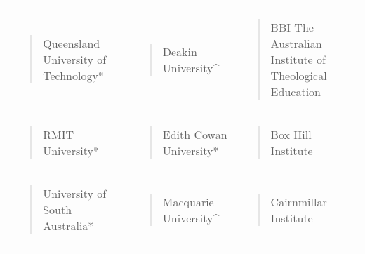 \documentclass[]{book}
\begin{document}
\begin{longtable}[]{@{}lll@{}}
\begin{minipage}[t]{0.32\columnwidth}\raggedright
\begin{quote}
Queensland University of Technology*
\end{quote}\strut
\end{minipage} & \begin{minipage}[t]{0.32\columnwidth}\raggedright
\begin{quote}
Deakin University\^{}
\end{quote}\strut
\end{minipage} & \begin{minipage}[t]{0.32\columnwidth}\raggedright
\begin{quote}
BBI The Australian Institute of Theological Education
\end{quote}\strut
\end{minipage}\tabularnewline
\begin{minipage}[t]{0.32\columnwidth}\raggedright
\begin{quote}
RMIT University*
\end{quote}\strut
\end{minipage} & \begin{minipage}[t]{0.32\columnwidth}\raggedright
\begin{quote}
Edith Cowan University*
\end{quote}\strut
\end{minipage} & \begin{minipage}[t]{0.32\columnwidth}\raggedright
\begin{quote}
Box Hill Institute
\end{quote}\strut
\end{minipage}\tabularnewline
\begin{minipage}[t]{0.32\columnwidth}\raggedright
\begin{quote}
University of South Australia*
\end{quote}\strut
\end{minipage} & \begin{minipage}[t]{0.32\columnwidth}\raggedright
\begin{quote}
Macquarie University\^{}
\end{quote}\strut
\end{minipage} & \begin{minipage}[t]{0.32\columnwidth}\raggedright
\begin{quote}
Cairnmillar Institute
\end{quote}\strut
\end{minipage}\tabularnewline

\end{longtable}
\end{document}
